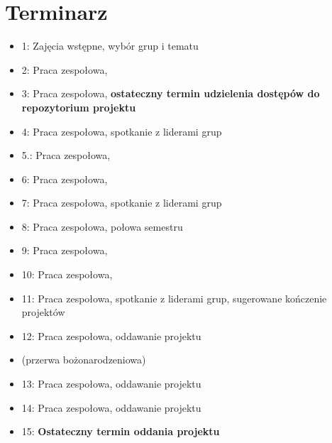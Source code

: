 \documentclass{article}
\begin{document}
	\section{Terminarz}
	\begin{itemize}
		\item 1: Zajęcia wstępne, wybór grup i tematu
		\item 2: Praca zespołowa,
		\item 3: Praca zespołowa, \textbf{ostateczny termin udzielenia dostępów do repozytorium projektu}
		\item 4: Praca zespołowa, spotkanie z liderami grup
		\item 5.: Praca zespołowa,
		\item 6: Praca zespołowa,
		\item 7: Praca zespołowa, spotkanie z liderami grup
		\item 8: Praca zespołowa, połowa semestru
		\item 9: Praca zespołowa,
		\item 10: Praca zespołowa,
		\item 11: Praca zespołowa, spotkanie z liderami grup, sugerowane kończenie projektów
		\item 12: Praca zespołowa, oddawanie projektu
		\item (przerwa bożonarodzeniowa)
		\item 13: Praca zespołowa, oddawanie projektu
		\item 14: Praca zespołowa, oddawanie projektu
		\item 15: \textbf{Ostateczny termin oddania projektu}
	\end{itemize}
\end{document}
